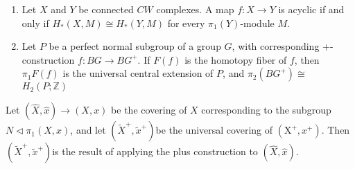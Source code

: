 \begin{prop} %
    \begin{enumerate}
        \item Let $X$ and $Y$ be connected $C W$ complexes. A map $f: X \rightarrow Y$ is acyclic if and only if $H_*(X, M) \cong H_*(Y, M)$ for every $\pi_1(Y)$-module $M$.
        \item Let $P$ be a perfect normal subgroup of a group $G$, with corresponding +-construction $f: B G \rightarrow B G^{+}$. If $F(f)$ is the homotopy fiber of $f$, then $\pi_1 F(f)$ is the universal central extension of $P$, and $\pi_2\left(B G^{+}\right) \cong$ $H_2(P ; \mathbb{Z})$
    \end{enumerate}
\end{prop}






\begin{prop}
Let $(\hat{X}, \hat{x}) \longrightarrow(X, x)$ be the covering of $X$ corresponding to the subgroup $N \triangleleft \pi_1(X, x)$, and let $\left(\tilde{X}^{+}, \tilde{x}^{+}\right)$be the universal covering of $\left(\mathrm{X}^{+}, x^{+}\right)$. Then $\left(\tilde{X}^{+}, \tilde{x}^{+}\right)$is the result of applying the plus construction to $(\hat{X}, \hat{x})$.

\end{prop}
